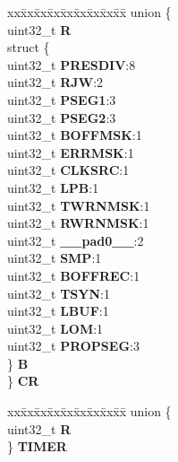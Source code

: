 \begin{DoxyCompactItemize}
\begin{tabbing}
\end{tabbing}\item 
\mbox{\label{structFLEXCAN2__tag_aa890f5e5338db0a2a489844d84689cd2}} 
\begin{tabbing}
xx\=xx\=xx\=xx\=xx\=xx\=xx\=xx\=xx\=\kill
union \{\\
\>uint32\_t {\bfseries R}\\
\>struct \{\\
\>\>uint32\_t {\bfseries PRESDIV}:8\\
\>\>uint32\_t {\bfseries RJW}:2\\
\>\>uint32\_t {\bfseries PSEG1}:3\\
\>\>uint32\_t {\bfseries PSEG2}:3\\
\>\>uint32\_t {\bfseries BOFFMSK}:1\\
\>\>uint32\_t {\bfseries ERRMSK}:1\\
\>\>uint32\_t {\bfseries CLKSRC}:1\\
\>\>uint32\_t {\bfseries LPB}:1\\
\>\>uint32\_t {\bfseries TWRNMSK}:1\\
\>\>uint32\_t {\bfseries RWRNMSK}:1\\
\>\>uint32\_t {\bfseries \_\_pad0\_\_}:2\\
\>\>uint32\_t {\bfseries SMP}:1\\
\>\>uint32\_t {\bfseries BOFFREC}:1\\
\>\>uint32\_t {\bfseries TSYN}:1\\
\>\>uint32\_t {\bfseries LBUF}:1\\
\>\>uint32\_t {\bfseries LOM}:1\\
\>\>uint32\_t {\bfseries PROPSEG}:3\\
\>\} {\bfseries B}\\
\} {\bfseries CR}\\

\end{tabbing}\item 
\mbox{\label{structFLEXCAN2__tag_ae02249f4de22764d9e53f271a53c5448}} 
\begin{tabbing}
xx\=xx\=xx\=xx\=xx\=xx\=xx\=xx\=xx\=\kill
union \{\\
\>uint32\_t {\bfseries R}\\
\} {\bfseries TIMER}\\


\end{tabbing}
\end{DoxyCompactItemize}
